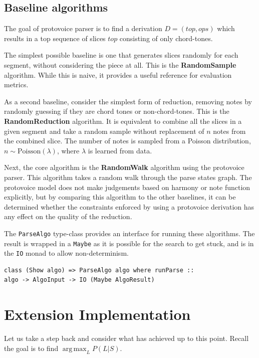 \documentclass[12pt,a4paper,twoside,openright]{report} \usepackage[pdfborder={0 0 0}]{hyperref}    %
\DeclareMathOperator*{\argmax}{arg\,max} \DeclareMathOperator*{\argmin}{arg\,min}
\theoremstyle{definition} \newtheorem{definition}{Definition}[section]
\begin{document}
\subsection{Baseline algorithms} The goal of protovoice parser is to find a derivation $D= (top, ops)$ which results in
a top sequence of slices $top$ consisting of only chord-tones. 

The simplest possible baseline is one that generates slices randomly for each segment, without considering the piece at
all. This is the \textbf{RandomSample} algorithm. While this is naive, it provides a useful reference for evaluation
metrics.

As a second baseline, consider the simplest form of reduction, removing notes by randomly guessing if they are chord
tones or non-chord-tones. This is the \textbf{RandomReduction} algorithm. It is equivalent to combine all the slices in
a given segment and take a random sample without replacement of $n$ notes from the combined slice. The number of notes
is sampled from a Poisson distribution, $n \sim \text{Poisson}(\lambda)$, where $\lambda$ is learned from data. 

Next, the core algorithm is the \textbf{RandomWalk} algorithm using the protovoice parser. This algorithm takes a random
walk through the parse states graph. The protovoice model does not make judgements based on harmony or note function
explicitly, but by comparing this algorithm to the other baselines, it can be determined whether the constraints
enforced by using a protovoice derivation has any effect on the quality of the reduction. 

The \texttt{ParseAlgo} type-class provides an interface for running these algorithms. The result is wrapped in
a \texttt{Maybe} as it is possible for the search to get stuck, and is in the \texttt{IO} monad to allow
non-determinism.

\begin{lstlisting}[caption={Algorithm type-class}, captionpos=b] class (Show algo) => ParseAlgo algo where runParse ::
algo -> AlgoInput -> IO (Maybe AlgoResult) \end{lstlisting}

\section{Extension Implementation}
Let us take a step back and consider what has achieved up to this point. Recall the goal is to find $\argmax_L P(L|S)$. 
\end{document}
